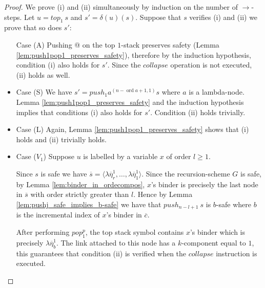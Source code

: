 \documentclass{article}
\newcommand{\ord}{\mathop{\mathrm{ord}}}
\theoremstyle{remark}
\theoremstyle{definition}
\newcommand\orddec\overline
\begin{document}
\begin{proof}
We prove (i) and (ii) simultaneously by induction on the number of
$\rightarrow$-steps. Let $u = top_1\ s$ and $s' =\delta(u)(s)$.
Suppose that $s$ verifies (i) and (ii) we prove that so does $s'$:
\begin{itemize}
\item[Case (A)] Pushing @ on the top $1$-stack preserves safety (Lemma
\ref{lem:push1pop1_preserves_safety}), therefore by the
induction hypothesis, condition (i) also holds for $s'$. Since
the $collapse$ operation is not executed, (ii) holds as well.

\item Case (S)
We have $s' = push_1 a^{(n-\ord{a}+1,1)} s$ where $a$ is a
lambda-node. Lemma \ref{lem:push1pop1_preserves_safety} and the
induction hypothesis implies that conditions (i) also holds for
$s'$. Condition (ii) holds trivially.

\item Case (L) Again, Lemma \ref{lem:push1pop1_preserves_safety}
shows that (i) holds and (ii) trivially holds.

\item Case ($V_1$) Suppose $u$ is labelled by a variable $x$ of order $l\geq 1$.

Since $s$ is safe we have $\orddec{s} = \langle \lambda
\overline{\eta}_r^1 , \ldots, \lambda \overline{\eta}_1^1
\rangle$.
Since the recursion-scheme $G$ is safe, by Lemma \ref{lem:binder_in_ordecompos}, $x$'s binder is precisely the
last node in $\orddec{s}$ with order strictly greater than $l$.
Hence by Lemma \ref{lem:pushj_safe_implies_b-safe}
we have that $push_{n-l+1}\ s$ is $b$-safe where $b$ is the
incremental index of $x$'s binder in $\orddec{c}$.

%
%

After performing $pop_1^p$, the top stack symbol contains $x$'s
binder which is precisely $\lambda \overline{\eta}_{b}^1$. The
link attached to this node has a $k$-component equal to $1$, this guarantees
that condition (ii) is verified when the $collapse$ instruction
is executed.


\end{itemize}
\end{proof}
\end{document}

